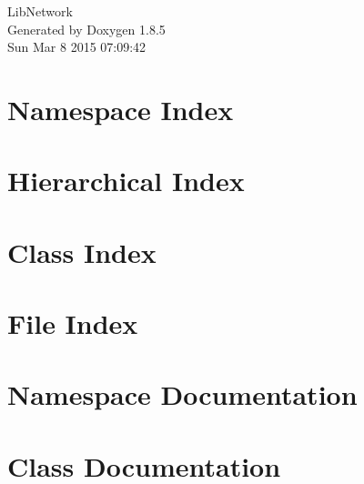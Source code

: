 \documentclass[twoside]{book}
\newcommand{\clearemptydoublepage}{%
  \newpage{\pagestyle{empty}\cleardoublepage}%
}
\begin{document}
\hypersetup{pageanchor=false}
\begin{titlepage}
\vspace*{7cm}
\begin{center}%
{\Large Lib\-Network }\\
\vspace*{1cm}
{\large Generated by Doxygen 1.8.5}\\
\vspace*{0.5cm}
{\small Sun Mar 8 2015 07:09:42}\\
\end{center}
\end{titlepage}
\clearemptydoublepage
\tableofcontents
\clearemptydoublepage
{}
\hypersetup{pageanchor=true}

\chapter{Namespace Index}

\chapter{Hierarchical Index}

\chapter{Class Index}

\chapter{File Index}

\chapter{Namespace Documentation}

\chapter{Class Documentation}





















\end{document}

